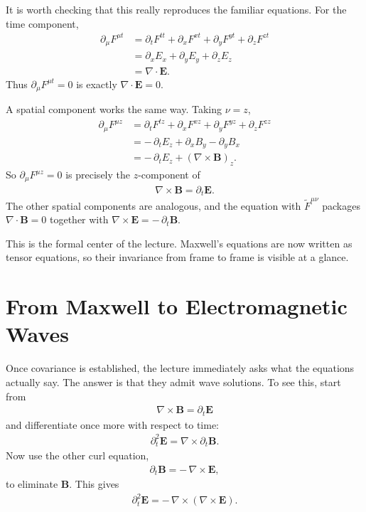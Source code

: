 It is worth checking that this really reproduces the familiar equations. For the time component,
\begin{align}
\partial_\mu F^{\mu t}
&= \partial_t F^{tt} + \partial_x F^{xt} + \partial_y F^{yt} + \partial_z F^{zt}\\
&= \partial_x E_x + \partial_y E_y + \partial_z E_z\\
&= \nabla \cdot \mathbf E.
\end{align}
Thus \(\partial_\mu F^{\mu t}=0\) is exactly \(\nabla \cdot \mathbf E=0\).

A spatial component works the same way. Taking \(\nu=z\),
\begin{align}
\partial_\mu F^{\mu z}
&= \partial_t F^{tz} + \partial_x F^{xz} + \partial_y F^{yz} + \partial_z F^{zz}\\
&= -\,\partial_t E_z + \partial_x B_y - \partial_y B_x\\
&= -\,\partial_t E_z + (\nabla \times \mathbf B)_z.
\end{align}
So \(\partial_\mu F^{\mu z}=0\) is precisely the \(z\)-component of
\begin{align}
\nabla \times \mathbf B = \partial_t \mathbf E.
\end{align}
The other spatial components are analogous, and the equation with \(\tilde F^{\mu\nu}\) packages \(\nabla\cdot \mathbf B=0\) together with \(\nabla\times \mathbf E = -\,\partial_t \mathbf B\).

This is the formal center of the lecture. Maxwell's equations are now written as tensor equations, so their invariance from frame to frame is visible at a glance.

\section{From Maxwell to Electromagnetic Waves}

Once covariance is established, the lecture immediately asks what the equations actually say. The answer is that they admit wave solutions. To see this, start from
\begin{align}
\nabla \times \mathbf B = \partial_t \mathbf E
\end{align}
and differentiate once more with respect to time:
\begin{align}
\partial_t^2 \mathbf E = \nabla \times \partial_t \mathbf B.
\end{align}
Now use the other curl equation,
\begin{align}
\partial_t \mathbf B = -\,\nabla \times \mathbf E,
\end{align}
to eliminate \(\mathbf B\). This gives
\begin{align}
\partial_t^2 \mathbf E = -\,\nabla \times (\nabla \times \mathbf E).
\end{align}

